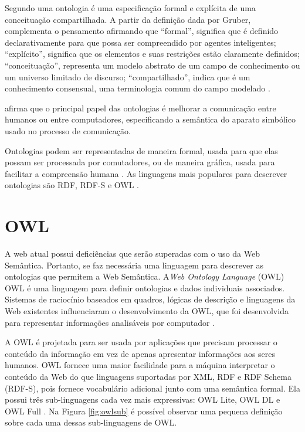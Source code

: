 \documentclass{bcc}
\begin{document}
Segundo \cite{gruber1995} uma ontologia é uma especificação formal e explícita de uma conceituação compartilhada. A partir da definição dada por Gruber, \cite{rocha2014} complementa o pensamento afirmando que “formal”, significa que é definido declarativamente para que possa ser compreendido por agentes inteligentes; “explícito”, significa que os elementos e suas restrições estão claramente definidos; “conceituação”, representa um modelo abstrato de um campo de conhecimento ou um universo limitado de discurso; “compartilhado”, indica que é um conhecimento consensual, uma terminologia comum do campo modelado \cite{rocha2014}.

\cite{lv2011} afirma que o principal papel das ontologias é melhorar a comunicação entre humanos ou entre computadores, especificando a semântica do aparato simbólico usado no processo de comunicação.

Ontologias podem ser representadas de maneira formal, usada para que elas possam ser processada por comutadores, ou de maneira gráfica, usada para facilitar a compreensão humana \cite{isotani2015}. As linguagens mais populares para descrever ontologias são RDF, RDF-S e OWL \cite{mcguinness}.


\section{OWL}

A web atual possui deficiências que serão superadas com o uso da Web Semântica. Portanto, se faz necessária uma linguagem para descrever as ontologias que permitem a Web Semântica. A\textit{Web Ontology Language} (OWL) OWL é uma linguagem para definir ontologias e dados individuais associados. Sistemas de raciocínio baseados em quadros, lógicas de descrição e linguagens da Web existentes influenciaram o desenvolvimento da OWL, que foi desenvolvida para representar informações analisáveis por computador \cite{lacy2005}.

A OWL é projetada para ser usada por aplicações que precisam processar o conteúdo da informação em vez de apenas apresentar informações aos seres humanos. OWL fornece uma maior facilidade para a máquina interpretar o conteúdo da Web do que linguagens suportadas por XML, RDF e RDF Schema (RDF-S), pois fornece vocabulário adicional junto com uma semântica formal. Ela possui três sub-linguagens cada vez mais expressivas: OWL Lite, OWL DL e OWL Full \cite{mcguinness}. Na Figura \ref{fig:owlsub} é possível observar uma pequena definição sobre cada uma dessas sub-linguagens de OWL.
\end{document}
